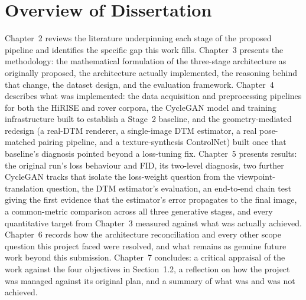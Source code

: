 \section{Overview of Dissertation}

Chapter~2 reviews the literature underpinning each stage of the proposed pipeline and identifies the specific gap this work fills. Chapter~3 presents the methodology: the mathematical formulation of the three-stage architecture as originally proposed, the architecture actually implemented, the reasoning behind that change, the dataset design, and the evaluation framework. Chapter~4 describes what was implemented: the data acquisition and preprocessing pipelines for both the HiRISE and rover corpora, the CycleGAN model and training infrastructure built to establish a Stage~2 baseline, and the geometry-mediated redesign (a real-DTM renderer, a single-image DTM estimator, a real pose-matched pairing pipeline, and a texture-synthesis ControlNet) built once that baseline's diagnosis pointed beyond a loss-tuning fix. Chapter~5 presents results: the original run's loss behaviour and FID, its two-level diagnosis, two further CycleGAN tracks that isolate the loss-weight question from the viewpoint-translation question, the DTM estimator's evaluation, an end-to-end chain test giving the first evidence that the estimator's error propagates to the final image, a common-metric comparison across all three generative stages, and every quantitative target from Chapter~3 measured against what was actually achieved. Chapter~6 records how the architecture reconciliation and every other scope question this project faced were resolved, and what remains as genuine future work beyond this submission. Chapter~7 concludes: a critical appraisal of the work against the four objectives in Section~1.2, a reflection on how the project was managed against its original plan, and a summary of what was and was not achieved.
